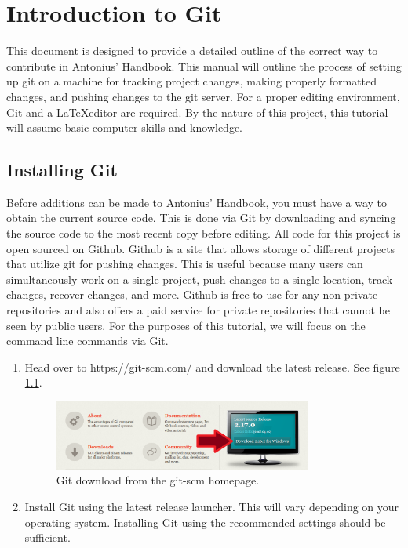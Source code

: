 \chapter{Introduction to Git}

This document is designed to provide a detailed outline of the correct way to contribute in Antonius' Handbook. This manual will outline the process of setting up git on a machine for tracking project changes, making properly formatted changes, and pushing changes to the git server. For a proper editing environment, Git and a \LaTeX editor are required. By the nature of this project, this tutorial will assume basic computer skills and knowledge.


\section{Installing Git}

Before additions can be made to Antonius' Handbook, you must have a way to obtain the current source code. This is done via Git by downloading and syncing the source code to the most recent copy before editing. All code for this project is open sourced on Github. Github is a site that allows storage of different projects that utilize git for pushing changes. This is useful because many users can simultaneously work on a single project, push changes to a single location, track changes, recover changes, and more. Github is free to use for any non-private repositories and also offers a paid service for private repositories that cannot be seen by public users. For the purposes of this tutorial, we will focus on the command line commands via Git.

\begin{enumerate}
	\item Head over to https://git-scm.com/ and download the latest release. See figure \ref{git}. 
	
	\begin{figure}[h]
		\centering
		\includegraphics[width=0.8\textwidth]{images/git.png}
		\caption{Git download from the git-scm homepage.} \label{git}
	\end{figure}

	\item Install Git using the latest release launcher. This will vary depending on your operating system. Installing Git using the recommended settings should be sufficient.
\end{enumerate}


